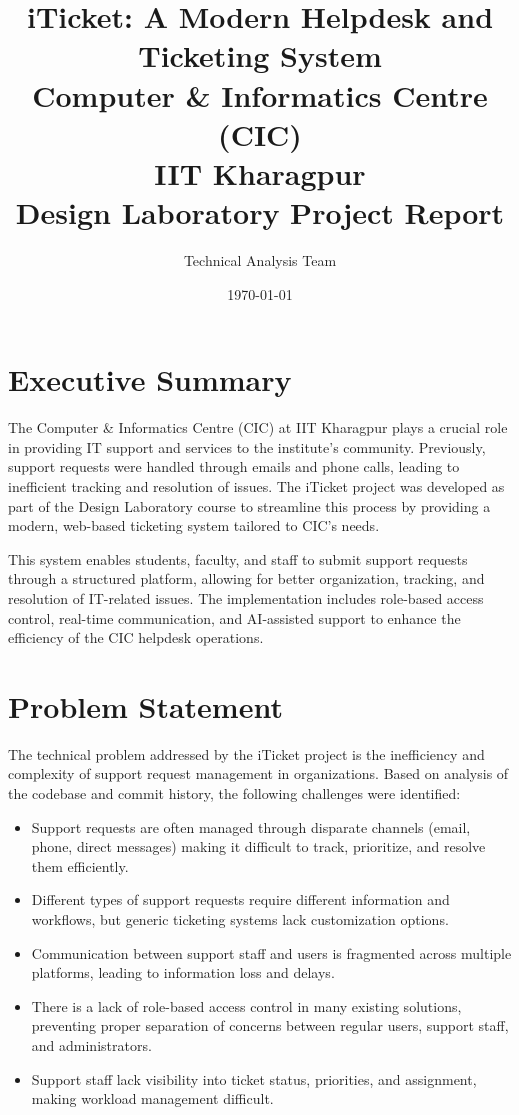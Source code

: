\documentclass[12pt,a4paper]{article}
\title{iTicket: A Modern Helpdesk and Ticketing System\\
       Computer \& Informatics Centre (CIC)\\
       IIT Kharagpur\\
       Design Laboratory Project Report}
\author{Technical Analysis Team}
\date{\today}
\begin{document}
\maketitle
\tableofcontents
\newpage

\section{Executive Summary}

The Computer \& Informatics Centre (CIC) at IIT Kharagpur plays a crucial role in providing IT support and services to the institute's community. Previously, support requests were handled through emails and phone calls, leading to inefficient tracking and resolution of issues. The iTicket project was developed as part of the Design Laboratory course to streamline this process by providing a modern, web-based ticketing system tailored to CIC's needs.

This system enables students, faculty, and staff to submit support requests through a structured platform, allowing for better organization, tracking, and resolution of IT-related issues. The implementation includes role-based access control, real-time communication, and AI-assisted support to enhance the efficiency of the CIC helpdesk operations.

\section{Problem Statement}

The technical problem addressed by the iTicket project is the inefficiency and complexity of support request management in organizations. Based on analysis of the codebase and commit history, the following challenges were identified:

\begin{itemize}
    \item Support requests are often managed through disparate channels (email, phone, direct messages) making it difficult to track, prioritize, and resolve them efficiently.
    \item Different types of support requests require different information and workflows, but generic ticketing systems lack customization options.
    \item Communication between support staff and users is fragmented across multiple platforms, leading to information loss and delays.
    \item There is a lack of role-based access control in many existing solutions, preventing proper separation of concerns between regular users, support staff, and administrators.
    \item Support staff lack visibility into ticket status, priorities, and assignment, making workload management difficult.
\end{itemize}
\end{document}
